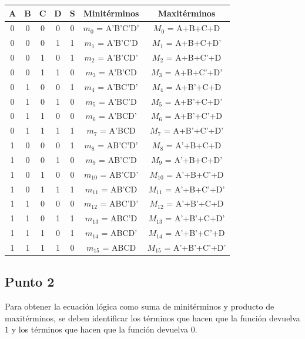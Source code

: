 \begin{table}[h]
    \centering
    \begin{tabular}{cccc|c|c|c}
        \toprule
        \textbf{A} & \textbf{B} & \textbf{C} & \textbf{D} & \textbf{S} & \textbf{Minitérminos} & \textbf{Maxitérminos}\\
        \midrule
        0 & 0 & 0 & 0 & 0 & $m_0$ = A'B'C'D' & $M_0$ = A+B+C+D\\
        0 & 0 & 0 & 1 & 1 & $m_1$ = A'B'C'D & $M_1$ = A+B+C+D'\\
        0 & 0 & 1 & 0 & 1 & $m_2$ = A'B'CD' & $M_2$ = A+B+C'+D\\
        0 & 0 & 1 & 1 & 0 & $m_3$ = A'B'CD & $M_3$ = A+B+C'+D'\\
        0 & 1 & 0 & 0 & 1 & $m_4$ = A'BC'D' & $M_4$ = A+B'+C+D\\
        0 & 1 & 0 & 1 & 0 & $m_5$ = A'BC'D & $M_5$ = A+B'+C+D'\\
        0 & 1 & 1 & 0 & 0 & $m_6$ = A'BCD' & $M_6$ = A+B'+C'+D\\
        0 & 1 & 1 & 1 & 1 & $m_7$ = A'BCD & $M_7$ = A+B'+C'+D'\\
        1 & 0 & 0 & 0 & 1 & $m_8$ = AB'C'D' & $M_8$ = A'+B+C+D\\
        1 & 0 & 0 & 1 & 0 & $m_9$ = AB'C'D & $M_9$ = A'+B+C+D'\\
        1 & 0 & 1 & 0 & 0 & $m_{10}$ = AB'CD' & $M_{10}$ = A'+B+C'+D\\
        1 & 0 & 1 & 1 & 1 & $m_{11}$ = AB'CD & $M_{11}$ = A'+B+C'+D'\\
        1 & 1 & 0 & 0 & 0 & $m_{12}$ = ABC'D' & $M_{12}$ = A'+B'+C+D\\
        1 & 1 & 0 & 1 & 1 & $m_{13}$ = ABC'D & $M_{13}$ = A'+B'+C+D'\\
        1 & 1 & 1 & 0 & 1 & $m_{14}$ = ABCD' & $M_{14}$ = A'+B'+C'+D\\
        1 & 1 & 1 & 1 & 0 & $m_{15}$ = ABCD & $M_{15}$ = A'+B'+C'+D'\\
        \bottomrule
    \end{tabular}
\end{table}

\subsection*{Punto 2}
Para obtener la ecuación lógica como suma de minitérminos y producto de maxitérminos, se deben identificar los términos que hacen que la función devuelva $1$ y los términos que hacen que la función devuelva $0$.

